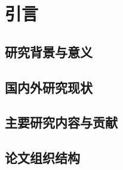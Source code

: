 \chapter{引言}
\label{ch:introduction}


\section{研究背景与意义}
\label{sec:background}

\section{国内外研究现状}
\label{sec:related-work}

\section{主要研究内容与贡献}
\label{sec:contributions}

\section{论文组织结构}
\label{sec:organization}
